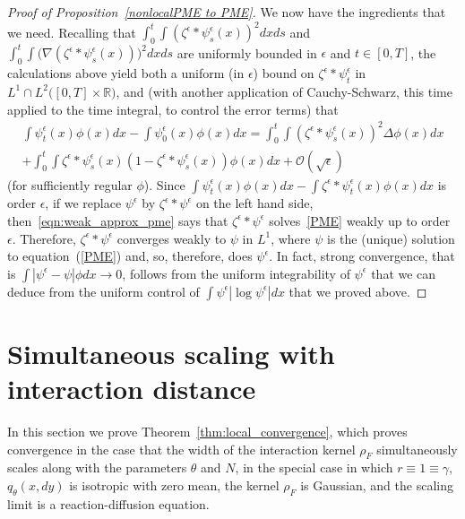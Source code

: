 \documentclass[EJP]{ejpecp} %
\newcommand{\IR}{\mathbb R}
\begin{document}
\begin{proof}[Proof of Proposition~\ref{nonlocalPME to PME}]
We now have the ingredients that we need. Recalling that 
$\int_0^t \int(\zeta^{\epsilon}*\psi_s^\epsilon(x))^2  dx ds$ and
$\int_0^t \int \big(\nabla (\zeta^{\epsilon}*\psi_s^\epsilon(x))\big)^2  dx ds$
are uniformly bounded in
$\epsilon$ and $t\in [0,T]$,
the calculations above yield both a uniform (in $\epsilon$) bound on
$\zeta^{\epsilon}*\psi_t^\epsilon$ in
$L^1\cap L^2\big([0,T]\times \IR\big)$, and (with another application of 
Cauchy-Schwarz, this time applied to the time integral, to control the error terms) that
\begin{multline} \label{eqn:weak_approx_pme}
\int \psi_t^\epsilon(x)\phi(x) dx-\int \psi_0^\epsilon (x)\phi(x) dx
	=\int_0^t\int (\zeta^{\epsilon}*\psi_s^\epsilon(x))^2\Delta\phi(x) dx
\\
	+\int_0^t \int \zeta^{\epsilon}*\psi_s^\epsilon(x)
	\left(1- \zeta^{\epsilon}*\psi_s^\epsilon(x)\right)
\phi(x) dx
	+\mathcal{O}(\sqrt{\epsilon})
\end{multline}
(for sufficiently regular $\phi$).
Since
$\int \psi_t^\epsilon(x)\phi(x) d x- \int \zeta^{\epsilon}*\psi_t^\epsilon (x)\phi(x) d x$
is order $\epsilon$,
if we replace $\psi^\epsilon$ by $\zeta^{\epsilon}*\psi^\epsilon$ on the left hand side,
then~\eqref{eqn:weak_approx_pme} says that $\zeta^{\epsilon}*\psi^\epsilon$
solves~\eqref{PME} weakly up to order $\epsilon$.
Therefore, $\zeta^{\epsilon}*\psi^\epsilon$ converges weakly to $\psi$ in $L^1$,
where $\psi$ is the (unique)
solution to equation~(\ref{PME})
and, so, therefore, does $\psi^\epsilon$. In fact, strong convergence, that is
$\int |\psi^\epsilon -\psi|\phi dx \to 0$, follows from the
uniform integrability of $\psi^\epsilon$ that we
can deduce from the uniform control of
$\int \psi^\epsilon|\log \psi^\epsilon| d x$ that we proved above.
\end{proof}


\section{Simultaneous scaling with interaction distance}
\label{subsec:one step convergence proof}

In this section we prove Theorem~\ref{thm:local_convergence},
which proves convergence in the case that the width of the interaction kernel $\rho_F$
simultaneously scales along with the parameters $\theta$ and $N$,
in the special case in which $r\equiv 1\equiv\gamma$, $q_{\theta}(x,dy)$
is isotropic with zero mean, the kernel
$\rho_F$ is Gaussian, and the scaling 
limit is a reaction-diffusion equation.
\end{document}
